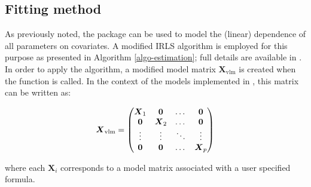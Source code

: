 \documentclass[nojss]{jss}
\newcommand{\1}{\mathcal{I}} \newcommand{\bZero}{\boldsymbol{0}}
\begin{document}
\subsection{Fitting method}\label{fitting-method}

As previously noted, the  package can be used to
model the (linear) dependence of all parameters on covariates. A
modified IRLS algorithm is employed for this purpose as presented in
Algorithm \ref{algo-estimation}; full details are available in
\cite{VGAM-main}. In order to apply the algorithm, a modified model
matrix \(\boldsymbol{X}_{\text{vlm}}\) is created when the
 function is called. In the context of the models
implemented in , this matrix can be written as:

\begin{equation}\label{X_vlm-definition}
  \boldsymbol{X}_{\text{vlm}}=
  \begin{pmatrix}
    \boldsymbol{X}_{1} & \boldsymbol{0}&\dotso &\boldsymbol{0}\cr
    \boldsymbol{0}& \boldsymbol{X}_{2} &\dotso &\boldsymbol{0}\cr
    \vdots & \vdots & \ddots & \vdots\cr
    \boldsymbol{0}& \boldsymbol{0}&\dotso &\boldsymbol{X}_{p}
  \end{pmatrix}
\end{equation}

where each \(\boldsymbol{X}_{i}\) corresponds to a model matrix
associated with a user specified formula.
\end{document}

